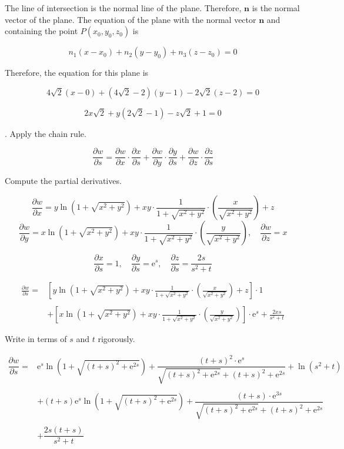 \documentclass{article}
\begin{document}
\hfill

\noindent The line of intersection is the normal line of the plane. Therefore, $\mathbf n$ is the normal vector of the plane. The equation of the plane with the normal vector $\mathbf n$ and containing the point $P(x_0,y_0,z_0)$ is

\[n_1(x-x_0)+n_2(y-y_0)+n_3(z-z_0)=0\]

\hfill

\noindent Therefore, the equation for this plane is

\[4\sqrt2(x-0)+\left(4\sqrt2-2\right)(y-1)-2\sqrt2(z-2)=0\]

\[\boxed{2x\sqrt2+y\left(2\sqrt2-1\right)-z\sqrt2+1=0}\]

\hfill

. Apply the chain rule.

\[\frac{\partial w}{\partial s}=\frac{\partial w}{\partial x}\cdot\frac{\partial x}{\partial s}+\frac{\partial w}{\partial y}\cdot\frac{\partial y}{\partial s}+\frac{\partial w}{\partial z}\cdot\frac{\partial z}{\partial s}\]

\hfill

\noindent Compute the partial derivatives.

\[\frac{\partial w}{\partial x}=y\ln\left(1+\sqrt{x^2+y^2}\right)+xy\cdot\frac1{1+\sqrt{x^2+y^2}}\cdot\left(\frac{x}{\sqrt{x^2+y^2}}\right)+z\]
\[\frac{\partial w}{\partial y}=x\ln\left(1+\sqrt{x^2+y^2}\right)+xy\cdot\frac1{1+\sqrt{x^2+y^2}}\cdot\left(\frac{y}{\sqrt{x^2+y^2}}\right),\quad \frac{\partial w}{\partial z}=x\]

\[\frac{\partial x}{\partial s}=1,\quad\frac{\partial y}{\partial s}=\mathrm{e}^s,\quad\frac{\partial z}{\partial s}=\frac{2s}{s^2+t}\]

\begin{align*}\frac{\partial w}{\partial s}=&\left[y\ln\left(1+\sqrt{x^2+y^2}\right)+xy\cdot\frac1{1+\sqrt{x^2+y^2}}\cdot\left(\frac{x}{\sqrt{x^2+y^2}}\right)+z\right]\cdot1\\\\&+\left[x\ln\left(1+\sqrt{x^2+y^2}\right)+xy\cdot\frac1{1+\sqrt{x^2+y^2}}\cdot\left(\frac{y}{\sqrt{x^2+y^2}}\right)\right]\cdot\mathrm{e}^s+\frac{2xs}{s^2+t}\end{align*}

\hfill

\noindent Write in terms of $s$ and $t$ rigorously.

\[\boxed{\begin{array}{ll}\dfrac{\partial w}{\partial s}=&
\mathrm{e}^s\ln\left(1+\sqrt{(t+s)^2+\mathrm{e}^{2s}}\right)+\dfrac{(t+s)^2\cdot\mathrm{e}^s}{\sqrt{(t+s)^2+\mathrm{e}^{2s}}+(t+s)^2+\mathrm{e}^{2s}}+\ln\left(s^2+t\right)\\\\&+(t+s)\mathrm{e}^s\ln\left(1+\sqrt{(t+s)^2+\mathrm{e}^{2s}}\right)+\dfrac{(t+s)\cdot\mathrm{e}^{3s}}{\sqrt{(t+s)^2+\mathrm{e}^{2s}}+(t+s)^2+\mathrm{e}^{2s}}\\\\&+\dfrac{2s(t+s)}{s^2+t}
\end{array}}\]
\end{document}
